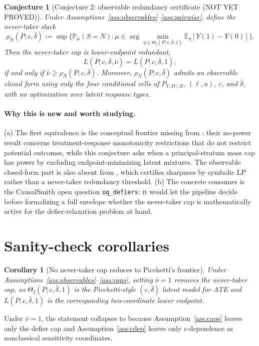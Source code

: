 \documentclass[11pt]{article}
\newcommand{\E}{\mathbb{E}}
\renewcommand{\Pr}{\mathbb{P}}
\theoremstyle{definition}
\theoremstyle{plain}
\newtheorem{conjecture}{Conjecture}
\newtheorem{corollary}{Corollary}
\theoremstyle{remark}
\begin{document}
\begin{conjecture}[Conjecture 2: observable redundancy certificate (NOT YET PROVED)]\label{conj:certificate}
Under Assumptions~\ref{ass:observables}--\ref{ass:pairwise}, define the
never-taker slack
\[
  \rho_N(P;c,\bar\delta)
  :=\sup\{\Pr_\mu(S=N):\mu\in
       \arg\min_{\eta\in\Theta_I(P;c,\bar\delta,1)}
       \E_\eta[Y(1)-Y(0)]\}.
\]
Then the never-taker cap is lower-endpoint redundant,
\[
  L(P;c,\bar\delta,\bar\nu)=L(P;c,\bar\delta,1),
\]
if and only if \(\bar\nu\ge \rho_N(P;c,\bar\delta)\).  Moreover,
\(\rho_N(P;c,\bar\delta)\) admits an observable closed form using only the four
conditional cells of \(P_{Y,D\mid Z}\), \((\ell,u)\), \(c\), and
\(\bar\delta\), with no optimization over latent response types.
\end{conjecture}

\paragraph{Why this is new and worth studying.}
(a) The first equivalence is the conceptual frontier missing from
\citet{BaiHuangMoonShaikhVytlacil2024}: their no-power result concerns
treatment-response monotonicity restrictions that do not restrict potential
outcomes, while this conjecture asks when a principal-stratum mass cap has
power by excluding endpoint-minimizing latent mixtures.  The observable
closed-form part is also absent from \citet{BalkePearl1997}, which certifies
sharpness by symbolic LP rather than a never-taker redundancy threshold.  (b)
The concrete consumer is the CausalSmith open question
\texttt{oq\_defiers}: it would let the pipeline decide before formalizing a
full envelope whether the never-taker cap is mathematically active for the
defier-relaxation problem at hand.

\section{Sanity-check corollaries}
\begin{corollary}[No never-taker cap reduces to Picchetti's frontier]\label{cor:picchetti}
Under Assumptions~\ref{ass:observables}--\ref{ass:caps}, setting
\(\bar\nu=1\) removes the never-taker cap, so
\(\Theta_I(P;c,\bar\delta,1)\) is the Picchetti-style
\((c,\bar\delta)\) latent model for ATE and \(L(P;c,\bar\delta,1)\) is the
corresponding two-coordinate lower endpoint.
\end{corollary}

Under \(\bar\nu=1\), the statement collapses to \citet{Picchetti2026} because
Assumption~\ref{ass:caps} leaves only the defier cap and
Assumption~\ref{ass:cdep} leaves only \(c\)-dependence as nonclassical
sensitivity coordinates.
\end{document}
